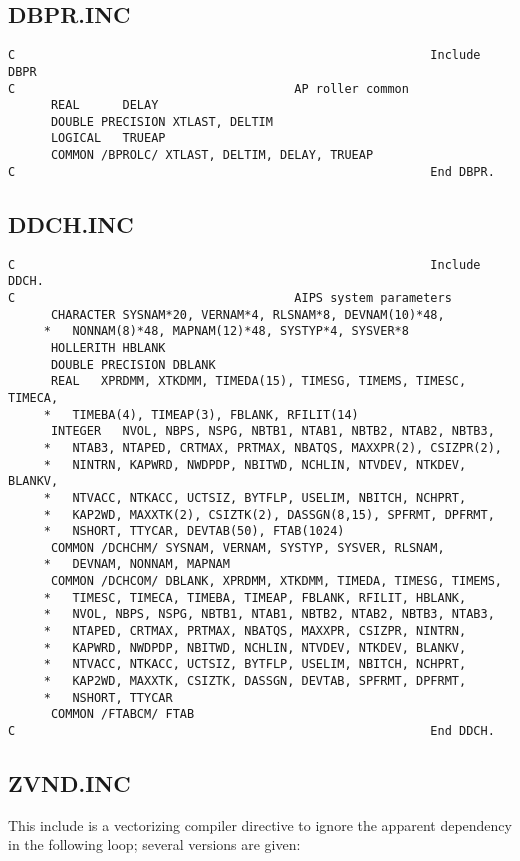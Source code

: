 \subsection{DBPR.INC}
\begin{verbatim}
C                                                          Include DBPR
C                                       AP roller common
      REAL      DELAY
      DOUBLE PRECISION XTLAST, DELTIM
      LOGICAL   TRUEAP
      COMMON /BPROLC/ XTLAST, DELTIM, DELAY, TRUEAP
C                                                          End DBPR.

\end{verbatim}
\subsection{DDCH.INC}
\begin{verbatim}
C                                                          Include DDCH.
C                                       AIPS system parameters
      CHARACTER SYSNAM*20, VERNAM*4, RLSNAM*8, DEVNAM(10)*48,
     *   NONNAM(8)*48, MAPNAM(12)*48, SYSTYP*4, SYSVER*8
      HOLLERITH HBLANK
      DOUBLE PRECISION DBLANK
      REAL   XPRDMM, XTKDMM, TIMEDA(15), TIMESG, TIMEMS, TIMESC, TIMECA,
     *   TIMEBA(4), TIMEAP(3), FBLANK, RFILIT(14)
      INTEGER   NVOL, NBPS, NSPG, NBTB1, NTAB1, NBTB2, NTAB2, NBTB3,
     *   NTAB3, NTAPED, CRTMAX, PRTMAX, NBATQS, MAXXPR(2), CSIZPR(2),
     *   NINTRN, KAPWRD, NWDPDP, NBITWD, NCHLIN, NTVDEV, NTKDEV, BLANKV,
     *   NTVACC, NTKACC, UCTSIZ, BYTFLP, USELIM, NBITCH, NCHPRT,
     *   KAP2WD, MAXXTK(2), CSIZTK(2), DASSGN(8,15), SPFRMT, DPFRMT,
     *   NSHORT, TTYCAR, DEVTAB(50), FTAB(1024)
      COMMON /DCHCHM/ SYSNAM, VERNAM, SYSTYP, SYSVER, RLSNAM,
     *   DEVNAM, NONNAM, MAPNAM
      COMMON /DCHCOM/ DBLANK, XPRDMM, XTKDMM, TIMEDA, TIMESG, TIMEMS,
     *   TIMESC, TIMECA, TIMEBA, TIMEAP, FBLANK, RFILIT, HBLANK,
     *   NVOL, NBPS, NSPG, NBTB1, NTAB1, NBTB2, NTAB2, NBTB3, NTAB3,
     *   NTAPED, CRTMAX, PRTMAX, NBATQS, MAXXPR, CSIZPR, NINTRN,
     *   KAPWRD, NWDPDP, NBITWD, NCHLIN, NTVDEV, NTKDEV, BLANKV,
     *   NTVACC, NTKACC, UCTSIZ, BYTFLP, USELIM, NBITCH, NCHPRT,
     *   KAP2WD, MAXXTK, CSIZTK, DASSGN, DEVTAB, SPFRMT, DPFRMT,
     *   NSHORT, TTYCAR
      COMMON /FTABCM/ FTAB
C                                                          End DDCH.
\end{verbatim}
\subsection{ZVND.INC}
This include is a vectorizing compiler directive to ignore the
apparent dependency in the following loop; several versions are given:

